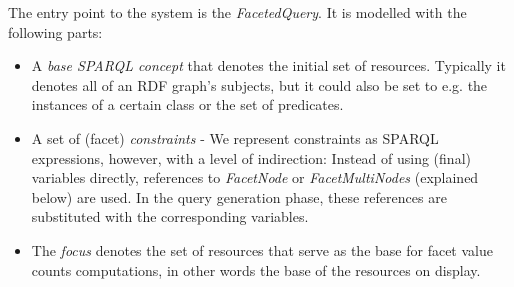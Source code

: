 The entry point to the system is the \emph{FacetedQuery}. It is modelled with the following parts:
\begin{itemize}
\item A \emph{base SPARQL concept} that denotes the initial set of resources. Typically it denotes all of an RDF graph's subjects, but
it could also be set to e.g. the instances of a certain class or the set of predicates.
\item A set of (facet) \emph{constraints} - We represent constraints as SPARQL expressions, however, with a level of indirection: Instead of using (final) variables directly, references to \emph{FacetNode} or \emph{FacetMultiNodes} (explained below) are used. In the query generation phase, these references are substituted with the corresponding variables.

\item The \emph{focus}
denotes the set of resources that serve as the base for facet value counts computations, in other words the base of the resources on display.
\end{itemize}

